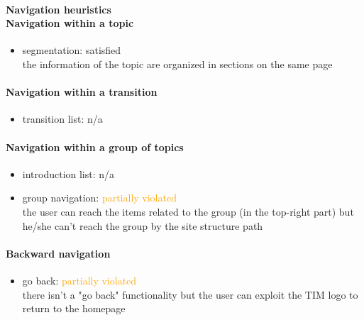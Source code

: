 \begin{enumerate}
	\paragraph*{Navigation heuristics \\ Navigation within a topic}
	\begin{itemize}
		\item segmentation: satisfied\\
		the information of the topic are organized in sections on the same page
	\end{itemize}	
	
	\paragraph*{Navigation within a transition}
	\begin{itemize}
		\item transition list: n/a
	\end{itemize}
	
	\paragraph*{Navigation within a group of topics}
	\begin{itemize}
		\item introduction list: n/a
		\item group navigation: \textcolor{orange}{partially violated}\\
		the user can reach the items related to the group (in the top-right part) but he/she can't reach the group by the site structure path
	\end{itemize}
	
	\paragraph*{Backward navigation}
	\begin{itemize}
		\item go back: \textcolor {orange}{partially violated}\\
		there isn't a "go back" functionality but the user can exploit the TIM logo to return to the homepage
	\end{itemize}
	

\end{enumerate}
